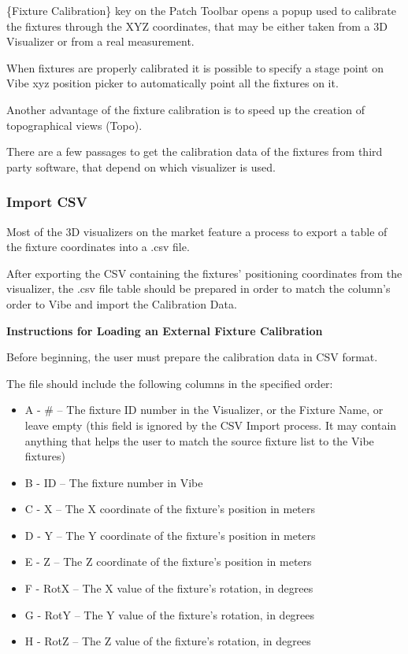 \documentclass[
]{article}
\begin{document}
\{Fixture Calibration\} key on the Patch Toolbar opens a popup used to calibrate the fixtures through the XYZ coordinates, that may be either taken from a 3D Visualizer or from a real measurement.

When fixtures are properly calibrated it is possible to specify a stage point on Vibe xyz position picker to automatically point all the fixtures on it.

Another advantage of the fixture calibration is to speed up the creation of topographical views (Topo).

There are a few passages to get the calibration data of the fixtures from third party software, that depend on which visualizer is used.

\hypertarget{import-csv}{%
\subsubsection{Import CSV}\label{import-csv}}

Most of the 3D visualizers on the market feature a process to export a table of the fixture coordinates into a .csv file.

After exporting the CSV containing the fixtures' positioning coordinates from the visualizer, the .csv file table should be prepared in order to match the column's order to Vibe and import the Calibration Data.

\textbf{Instructions for Loading an External Fixture Calibration}

Before beginning, the user must prepare the calibration data in CSV format.

The file should include the following columns in the specified order:

\begin{itemize}
\item
  A - \# -- The fixture ID number in the Visualizer, or the Fixture Name, or leave empty (this field is ignored by the CSV Import process. It may contain anything that helps the user to match the source fixture list to the Vibe fixtures)
\item
  B - ID -- The fixture number in Vibe
\item
  C - X -- The X coordinate of the fixture's position in meters
\item
  D - Y -- The Y coordinate of the fixture's position in meters
\item
  E - Z -- The Z coordinate of the fixture's position in meters
\item
  F - RotX -- The X value of the fixture's rotation, in degrees
\item
  G - RotY -- The Y value of the fixture's rotation, in degrees
\item
  H - RotZ -- The Z value of the fixture's rotation, in degrees
\end{itemize}
\end{document}
